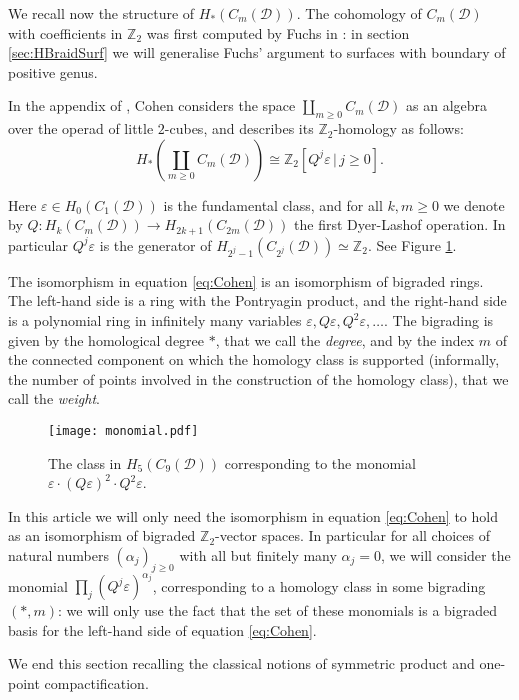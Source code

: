 \documentclass{amsart}
\theoremstyle{plain}
\theoremstyle{definition}
\newcommand{\D}{\mathcal{D}}
\newcommand{\Z}{\mathbb{Z}}
\newcommand{\pa}[1]{\left(#1\right)}
\renewcommand{\epsilon}{\varepsilon}
\begin{document}
We recall now the structure of $H_*(C_m(\D))$.
The cohomology of $C_m(\D)$ with coefficients in $\Z_2$ was first computed by Fuchs in
\cite{Fuchs:CohomBraidModtwo}: in section
\ref{sec:HBraidSurf} we will generalise  Fuchs' argument to surfaces with boundary of positive genus.

In the appendix of \cite[Chap.III]{CLM}, Cohen considers the space $\coprod_{m\geq 0}C_m(\D)$ as an
algebra over the operad of little $2$-cubes, and describes its
$\Z_2$-homology as follows:
\begin{equation}
 \label{eq:Cohen}
H_*\pa{\coprod_{m\geq 0}C_m(\D)}\cong \Z_2\left[Q^j\epsilon \, |\, j\geq 0\right].
\end{equation}

Here $\epsilon\in H_0(C_1(\D))$ is the fundamental class, and for all
$k,m\geq 0$ we denote by $Q\colon H_k(C_m(\D))\to H_{2k+1}(C_{2m}(\D))$
the first Dyer-Lashof operation. In particular $Q^j\epsilon$ is the generator of
$H_{2^j-1}(C_{2^j}(\D))\simeq\Z_2$. See Figure \ref{fig:monomial}.

The isomorphism in equation \eqref{eq:Cohen} is
an isomorphism of bigraded rings. The left-hand side is a ring with the Pontryagin product,
and the right-hand side is a polynomial ring in infinitely many variables $\epsilon,Q\epsilon,Q^2\epsilon,\dots$.
The bigrading is given by the homological degree
$*$, that we call the \emph{degree},
and by the index $m$ of the connected component
on which the homology class is supported (informally, the number of points
involved in the construction of the homology class), that we call the \emph{weight}.

 \begin{figure}[ht]\centering
 \texttt{[image: monomial.pdf]}
 \caption{The class in $H_5(C_9(\D))$ corresponding to the monomial $\epsilon\cdot(Q\epsilon)^2\cdot Q^2\epsilon$.}
\label{fig:monomial}
\end{figure}

In this article we will only need the isomorphism in equation \eqref{eq:Cohen} to hold as
an isomorphism of bigraded $\Z_2$-vector spaces.
In particular for all choices of natural numbers $(\alpha_j)_{j\geq 0}$ with all but finitely
many $\alpha_j=0$, we will consider the monomial $\prod_j\pa{Q^j\epsilon}^{\alpha_j}$, corresponding to
a homology class in some bigrading $(*,m)$: we will only use the fact
that the set of these monomials is a bigraded basis for the
left-hand side of equation \eqref{eq:Cohen}.

We end this section recalling the classical notions of symmetric product and one-point compactification.
\end{document}

